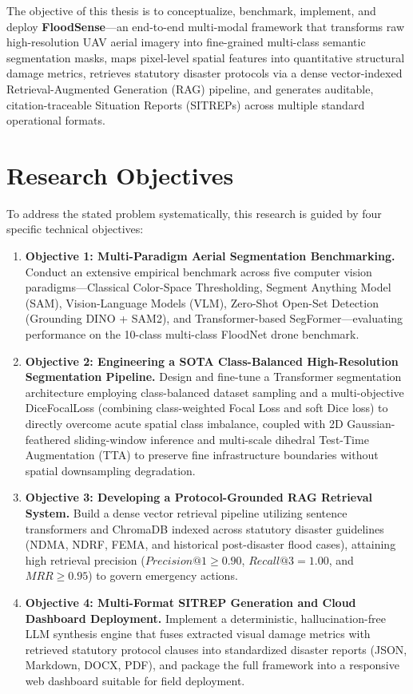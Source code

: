 The objective of this thesis is to conceptualize, benchmark, implement, and deploy \textbf{FloodSense}—an end-to-end multi-modal framework that transforms raw high-resolution UAV aerial imagery into fine-grained multi-class semantic segmentation masks, maps pixel-level spatial features into quantitative structural damage metrics, retrieves statutory disaster protocols via a dense vector-indexed Retrieval-Augmented Generation (RAG) pipeline, and generates auditable, citation-traceable Situation Reports (SITREPs) across multiple standard operational formats.

\section{Research Objectives}
To address the stated problem systematically, this research is guided by four specific technical objectives:
\begin{enumerate}
    \item \textbf{Objective 1: Multi-Paradigm Aerial Segmentation Benchmarking.} Conduct an extensive empirical benchmark across five computer vision paradigms—Classical Color-Space Thresholding, Segment Anything Model (SAM), Vision-Language Models (VLM), Zero-Shot Open-Set Detection (Grounding DINO + SAM2), and Transformer-based SegFormer—evaluating performance on the 10-class multi-class FloodNet drone benchmark.
    \item \textbf{Objective 2: Engineering a SOTA Class-Balanced High-Resolution Segmentation Pipeline.} Design and fine-tune a Transformer segmentation architecture employing class-balanced dataset sampling and a multi-objective DiceFocalLoss (combining class-weighted Focal Loss and soft Dice loss) to directly overcome acute spatial class imbalance, coupled with 2D Gaussian-feathered sliding-window inference and multi-scale dihedral Test-Time Augmentation (TTA) to preserve fine infrastructure boundaries without spatial downsampling degradation.
    \item \textbf{Objective 3: Developing a Protocol-Grounded RAG Retrieval System.} Build a dense vector retrieval pipeline utilizing sentence transformers and ChromaDB indexed across statutory disaster guidelines (NDMA, NDRF, FEMA, and historical post-disaster flood cases), attaining high retrieval precision ($Precision@1 \ge 0.90$, $Recall@3 = 1.00$, and $MRR \ge 0.95$) to govern emergency actions.
    \item \textbf{Objective 4: Multi-Format SITREP Generation and Cloud Dashboard Deployment.} Implement a deterministic, hallucination-free LLM synthesis engine that fuses extracted visual damage metrics with retrieved statutory protocol clauses into standardized disaster reports (JSON, Markdown, DOCX, PDF), and package the full framework into a responsive web dashboard suitable for field deployment.
\end{enumerate}

